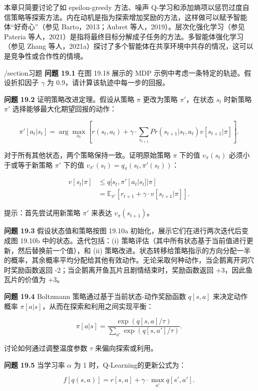 本章只简要讨论了如 epsilon-greedy 方法、噪声 Q-学习和添加熵项以惩罚过度自信策略等探索方法。内在动机是指为探索增加奖励的方法，这样做可以赋予智能体“好奇心”（参见 Barto，2013；Aubret 等人，2019）。层次化强化学习（参见 Pateria 等人，2021）是指将最终目标分解成子任务的方法。多智能体强化学习（参见 Zhang 等人，2021a）探讨了多个智能体在共享环境中共存的情况，这可以是竞争性或合作性的情境。


/section{习题}
\textbf{问题 19.1} 在图 19.18 展示的 MDP 示例中考虑一条特定的轨迹。假设折扣因子 \(\gamma\) 为 0.9，请计算该轨迹中每一步的回报。

\textbf{问题 19.2} 证明策略改进定理。假设从策略 \(\pi\) 更改为策略 \(\pi'\)，在状态 \(s_t\) 时新策略 \(\pi'\) 选择能够最大化期望回报的动作：

\[
\pi'[a_t|s_t] = \arg\max_{a_t} \left[ r(s_t, a_t) + \gamma \cdot \sum_{s_{t+1}} Pr(s_{t+1} | s_t, a_t)v[s_{t+1} | \pi] \right]. \tag{19.43}
\]

对于所有其他状态，两个策略保持一致。证明原始策略 \(\pi\) 下的值 \(v_{\pi}(s_t)\) 必须小于或等于新策略 \(\pi'\) 下的值 \(v_{\pi'}(s_t) = q_{\pi}(s_t, \pi'(s_t))\)：


\begin{align}
v[s_t | \pi] &\leq q[s_t, \pi'[a_t|s_t] | \pi] \\
&= \mathbb{E}_{\pi'}[r_{t+1} + \gamma \cdot v[s_{t+1} | \pi]].
\end{align} 


提示：首先尝试用新策略 \(\pi'\) 来表达 \(v_{\pi}(s_{t+1})\)。

\textbf{问题 19.3} 假设状态值和策略按图 19.10a 初始化，展示它们在进行两次迭代后变成图 19.10b 中的状态。迭代包括：(i) 策略评估（其中所有状态基于当前值进行更新，然后替换前一个值），和 (ii) 策略改进。状态转移给策略指示的方向分配一半的概率，其余概率平均分配给其他有效动作。无论采取何种动作，当企鹅离开洞穴时奖励函数返回 -2；当企鹅离开鱼瓦片且剧情结束时，奖励函数返回 +3，因此鱼瓦片的价值为 +3。

\textbf{问题 19.4} Boltzmann 策略通过基于当前状态-动作奖励函数 \(q[s, a]\) 来决定动作概率 \(\pi[a|s]\)，从而在探索和利用之间实现平衡：

\[
\pi[a|s] = \frac{\exp(q[s, a]/\tau)}{\sum_{a'} \exp(q[s, a']/\tau)}. \tag{19.45}
\]

讨论如何通过调整温度参数 \(\tau\) 来偏向探索或利用。

\textbf{问题 19.5} 当学习率 \(\alpha\) 为 1 时，Q-Learning的更新公式为：

\[
f[q(s, a)] = r[s, a] + \gamma \cdot \max_{a'} q[s', a']. \tag{19.46}
\]

